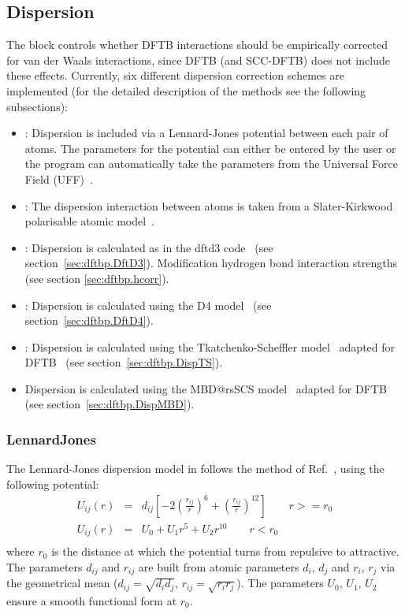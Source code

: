 \subsection{Dispersion}
\label{sec:dftbp.Dispersion}

The  block controls whether DFTB interactions should be
empirically corrected for van der Waals interactions, since DFTB (and
SCC-DFTB) does not include these effects. Currently, six different
dispersion correction schemes are implemented (for the detailed
description of the methods see the following subsections):
\begin{itemize}
\item {}: Dispersion is included via a Lennard-Jones
  potential between each pair of atoms. The parameters for the
  potential can either be entered by the user or the program can
  automatically take the parameters from the Universal Force Field
  (UFF)~\cite{rappe-JACS-114-10024}.
\item {}: The dispersion interaction between atoms is
  taken from a Slater-Kirkwood polarisable atomic
  model~\cite{elstner-jcp-114-5149}.
\item {}: Dispersion is calculated as in the dftd3
  code~\cite{grimme-jcp-132-154104,grimme-jcp-32-1456-1465} (see
  section~\ref{sec:dftbp.DftD3}). Modification hydrogen bond interaction
  strengths (see section \ref{sec:dftbp.hcorr}).
\item {}: Dispersion is calculated using the D4
  model~\cite{caldweyher-jcp-147-034112,caldeweyher-jcp-150-154122} (see
  section~\ref{sec:dftbp.DftD4}).
\item {}: Dispersion is calculated using the Tkatchenko-Scheffler model~\cite{TkatchenkoPRL09}
adapted for DFTB~\cite{StohrJCP16} (see section~\ref{sec:dftbp.DispTS}).
\item {} Dispersion is calculated using the MBD@rsSCS model~\cite{AmbrosettiJCP14}
adapted for DFTB~\cite{StohrJCP16} (see section~\ref{sec:dftbp.DispMBD}).
\end{itemize}

\subsubsection{LennardJones}
\label{sec:dftbp.LennardJones}

The Lennard-Jones dispersion model in \dftbp{} follows the method of
Ref.~\cite{zhechkov-JCTC-1-841}, using the following potential:
\begin{eqnarray*}
U_{ij}(r)&=&d_{ij}\left[-2\left(\frac{r_{ij}}{r}\right)^6 +
  \left(\frac{r_{ij}}{r}\right)^{12}\right]\qquad r >= r_0\\
U_{ij}(r)&=&U_0 + U_1 r^5 + U_2 r^{10}\qquad r < r_0\\
\end{eqnarray*}
where $r_0$ is the distance at which the potential turns from
repulsive to attractive. The parameters $d_{ij}$ and $r_{ij}$ are
built from atomic parameters $d_i$, $d_j$ and $r_i$, $r_j$ via the
geometrical mean ($d_{ij} = \sqrt{d_id_j}$,
$r_{ij}=\sqrt{r_ir_j}$). The parameters $U_0$, $U_1$, $U_2$ ensure a
smooth functional form at $r_0$.

